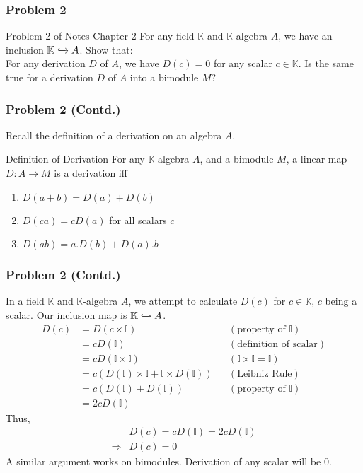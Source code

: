 
\begin{frame}
\frametitle{Problem 2}
\begin{block}{Problem 2 of Notes Chapter 2}
For any field $\mathbb{K}$ and $\mathbb{K}$-algebra $A$, we have an inclusion $\mathbb{K}\xhookrightarrow{} A$. Show that:\\
For any derivation $D$ of $A$, we have $D(c) = 0$ for any scalar $c\in\mathbb{K}$. Is the
same true for a derivation $D$ of $A$ into a bimodule $M$?
\end{block}
\end{frame}

\begin{frame}
\frametitle{Problem 2 (Contd.)}
Recall the definition of a derivation on an algebra $A$.
\begin{block}{Definition of Derivation}
For any $\mathbb{K}$-algebra $A$, and a bimodule $M$, a linear map $D:A\rightarrow M$ is a derivation iff\\
\begin{enumerate}
\item $D(a+b)=D(a)+D(b)$
\item $D(ca)=cD(a)$ for all scalars $c$
\item $D(ab)=a.D(b)+D(a).b$
\end{enumerate}
\end{block}
\end{frame}


\begin{frame}
\frametitle{Problem 2 (Contd.)}
In a field $\mathbb{K}$ and $\mathbb{K}$-algebra $A$, we attempt to calculate $D(c)$ for $c\in\mathbb{K}$, $c$ being a scalar. Our inclusion map is $\mathbb{K}\xhookrightarrow{} A$.
\begin{align*}
D(c) &= D(c\times\mathbb{I})&&(\text{property of }\mathbb{I})\\
&= cD(\mathbb{I})&&(\text{definition of scalar})\\
&= cD(\mathbb{I}\times\mathbb{I})&&(\mathbb{I}\times\mathbb{I}=\mathbb{I})\\
&= c(D(\mathbb{I})\times\mathbb{I}+\mathbb{I}\times D(\mathbb{I}))&&(\text{Leibniz Rule})\\
&= c(D(\mathbb{I})+D(\mathbb{I}))&&(\text{property of }\mathbb{I})\\
&= 2cD(\mathbb{I})
\end{align*}
Thus,
\begin{align*}
&D(c) = cD(\mathbb{I})= 2cD(\mathbb{I})\\
\Rightarrow &D(c)=0
\end{align*}
A similar argument works on bimodules. Derivation of any scalar will be $0$.
\end{frame}
